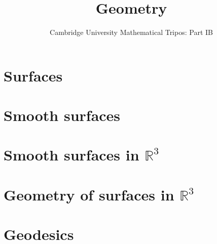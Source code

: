 \documentclass{article}
\title{Geometry}
\author{Cambridge University Mathematical Tripos: Part IB}
\begin{document}
\maketitle

\tableofcontentsnewpage{}

\section{Surfaces}

\section{Smooth surfaces}

\section{Smooth surfaces in \( \mathbb R^3 \)}

\section{Geometry of surfaces in \( \mathbb R^3 \)}

\section{Geodesics}

\end{document}
